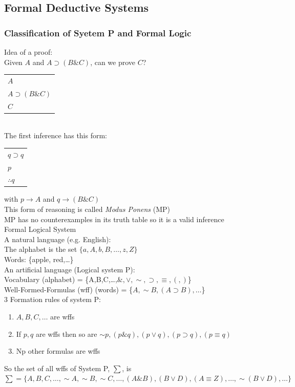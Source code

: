\documentclass[11pt, fleqn]{article}
\newcommand{\argument}[2]{\begin{tabular}{p{#1 cm}} #2 \end{tabular}}
\begin{document}
\subsection{Formal Deductive Systems}

\subsubsection{Classification of Syetem P and Formal Logic}

Idea of a proof:\\
Given $A$ and $A\supset(B\& C)$, can we prove $C$?\\
\begin{tabular}{p{3cm}}
    $A$\\
    $A\supset(B\& C)$\\
    \hline
    $C$
\end{tabular}\\
The first inference has this form:\\
\argument{1}{$q\supset q$\\ $p$\\ \hline $\therefore q$} with $p\to A$ and $q\to(B\&C)$\\
This form of reasoning is called \textit{Modus Ponens} (MP)\\
MP has no counterexamples in its truth table so it is a valid inference\\

Formal Logical System\\
A natural language (e.g. English):\\
The alphabet is the set $\{a,A,b,B,\ldots,z,Z\}$\\
Words: \{apple, red,\ldots\}\\
An artificial language (Logical system P):\\
Vocabulary (alphabet) = \{A,B,C,\ldots,$\&,\vee,\sim,\supset,\equiv,(,)$\}\\
Well-Formed-Formulas (wff) (words) = \{$A,\sim B,(A\supset B),\ldots$\}\\

3 Formation rules of system P:
\begin{enumerate}
    \item $A,B,C,\ldots$ are wffs
    \item If $p,q$ are wffs then so are $\sim p,(p\& q),(p\vee q),(p\supset q),(p\equiv q)$
    \item Np other formulas are wffs
\end{enumerate}
So the set of all wffs of System P, $\sum$, is\\
$\sum=\{A,B,C,\ldots,\sim A,\sim B,\sim C,\ldots,(A\& B),(B\vee D),(A\equiv Z),\ldots,\sim(B\vee D),\ldots\}$\\
\end{document}
